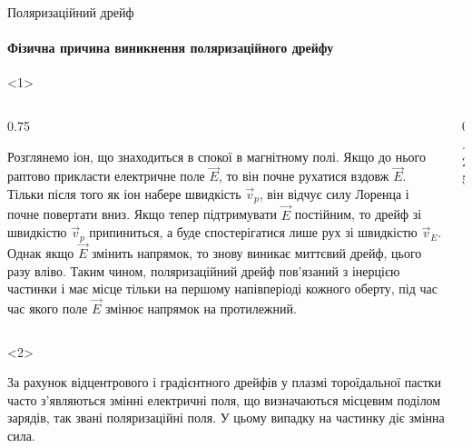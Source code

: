 \documentclass[]{beamer}
\begin{document}
\begin{frame}{Поляризаційний дрейф}{}\small
\framesubtitle<1>{Фізична причина виникнення поляризаційного дрейфу}
\begin{onlyenv}<1>
\begin{columns}
	\begin{column}{0.75\linewidth}
        \begin{block}{}\justifying
             Розглянемо іон, що знаходиться в спокої в магнітному полі. Якщо до нього раптово
             прикласти електричне поле $\vec{E}$, то він почне рухатися вздовж $\vec{E}$. Тільки
             після того як іон набере швидкість $\vec{v}_p$, він відчує силу Лоренца і почне
             повертати вниз. Якщо тепер підтримувати $\vec{E}$ постійним, то дрейф зі швидкістю
             $\vec{v}_p$ припиниться, а буде спостерігатися лише рух зі швидкістю $\vec{v}_E$.
             Однак якщо $\vec{E}$ змінить напрямок, то знову виникає миттєвий дрейф, цього разу
             вліво. Таким чином, поляризаційний дрейф пов'язаний з інерцією частинки і має місце
             тільки на першому напівперіоді кожного оберту, під час час якого поле $\vec{E}$ змінює
             напрямок на протилежний.
        \end{block}
	\end{column}
	\begin{column}{0.25\linewidth}\centering
	\end{column}
\end{columns}
\end{onlyenv}
\begin{onlyenv}<2>
	\begin{block}{}\justifying
		За рахунок відцентрового і градієнтного дрейфів у плазмі тороїдальної пастки часто
		з'являються змінні електричні поля, що визначаються місцевим поділом зарядів, так звані
		поляризаційні поля. У цьому випадку на частинку діє змінна сила.
	\end{block}


\end{onlyenv}
\end{frame}
\end{document}
